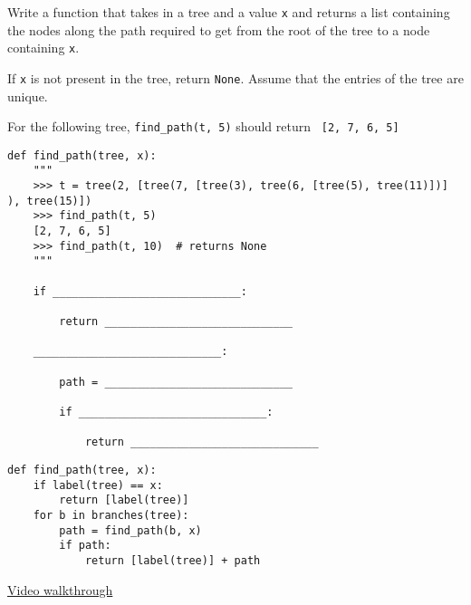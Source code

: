 \question
Write a function that takes in a tree and a value \texttt{x} and returns a
list containing the nodes along the path required to get from the root of
the tree to a node containing \texttt{x}.

If \texttt{x} is not present in the tree, return \texttt{None}. Assume
that the entries of the tree are unique.


For the following tree, \texttt{find\_path(t, 5)} should return {\tt
  [2, 7, 6, 5]}
\begin{center}
\end{center}

\begin{lstlisting}
def find_path(tree, x):
    """
    >>> t = tree(2, [tree(7, [tree(3), tree(6, [tree(5), tree(11)])] ), tree(15)])
    >>> find_path(t, 5)
    [2, 7, 6, 5]
    >>> find_path(t, 10)  # returns None
    """

    if _____________________________:

        return _____________________________

    _____________________________:

        path = _____________________________

        if _____________________________:

            return _____________________________
\end{lstlisting}

\begin{solution}[1.25in]
\begin{lstlisting}
def find_path(tree, x):
    if label(tree) == x:
        return [label(tree)]
    for b in branches(tree):
        path = find_path(b, x)
        if path:
            return [label(tree)] + path
\end{lstlisting}
\href{https://www.youtube.com/watch?v=OnLa_VUrWiA&list=PLx38hZJ5RLZcgrSJp16YmzNwn9hL5JD8q&index=3&t=0m11s}{Video walkthrough}
\end{solution}
